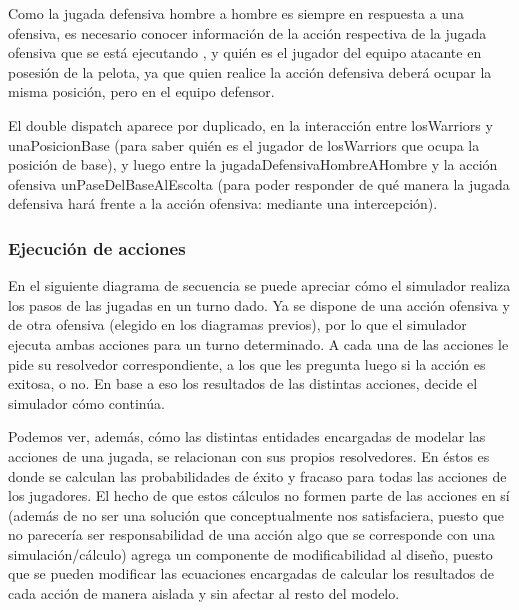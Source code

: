 Como la jugada defensiva hombre a hombre es siempre en respuesta a una ofensiva, es necesario conocer información de la acción respectiva de la jugada ofensiva que se está ejecutando , y quién es el jugador del equipo atacante en posesión de la pelota, ya que quien realice la acción defensiva deberá ocupar la misma posición, pero en el equipo defensor.

El double dispatch aparece por duplicado, en la interacción entre losWarriors y unaPosicionBase (para saber quién es el jugador de losWarriors que ocupa la posición de base), y luego entre la jugadaDefensivaHombreAHombre y la acción ofensiva unPaseDelBaseAlEscolta (para poder responder de qué manera la jugada defensiva hará frente a la acción ofensiva: mediante una intercepción).

\subsubsection{Ejecución de acciones}
En el siguiente diagrama de secuencia se puede apreciar cómo el simulador realiza los pasos de las jugadas en un turno dado. Ya se dispone de una acción ofensiva y de otra ofensiva (elegido en los diagramas previos), por lo que el simulador ejecuta ambas acciones para un turno determinado. A cada una de las acciones le pide su resolvedor correspondiente, a los que les pregunta luego si la acción es exitosa, o no. En base a eso los resultados de las distintas acciones, decide el simulador cómo continúa.

Podemos ver, además, cómo las distintas entidades encargadas de modelar las acciones de una jugada, se relacionan con sus propios resolvedores. En éstos es donde se calculan las probabilidades de éxito y fracaso para todas las acciones de los jugadores. El hecho de que estos cálculos no formen parte de las acciones en sí (además de no ser una solución que conceptualmente nos satisfaciera, puesto que no parecería ser responsabilidad de una acción algo que se corresponde con una simulación/cálculo) agrega un componente de modificabilidad al diseño, puesto que se pueden modificar las ecuaciones encargadas de calcular los resultados de cada acción de manera aislada y sin afectar al resto del modelo.

